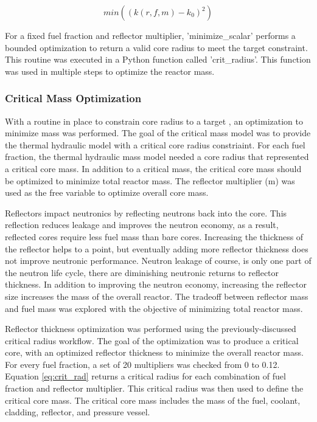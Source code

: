 \begin{equation}
    min( (k(r, f, m) - k_0)^2 )
    \label{eq:crit_rad}
\end{equation}

For a fixed fuel fraction and reflector multiplier, 'minimize\_scalar' performs a
bounded optimization to return a valid core radius to meet the target \keff
constraint. This routine was executed in a Python function called 'crit\_radius'.
This function was used in multiple steps to optimize the reactor mass.

\subsubsection{Critical Mass Optimization}
With a routine in place to constrain core radius to a target \keff, an
optimization to minimize mass was performed. The goal of the critical mass model
was to provide the thermal hydraulic model with a critical core radius
constriaint. For each
fuel fraction, the thermal hydraulic mass model needed a core radius that
represented a critical core mass. In addition to a critical mass, the critical
core mass should be optimized to minimize total reactor mass. 
The reflector multiplier (m) was used as the free variable to optimize overall core mass. 

Reflectors impact neutronics by reflecting neutrons back into the core. This
reflection reduces leakage and improves the neutron economy, as a result,
reflected cores require less fuel mass than bare cores. Increasing the
thickness of the reflector helps to a point, but eventually adding more reflector
thickness does not improve neutronic performance. Neutron leakage of course, is only
one part of the neutron life cycle, there are diminishing neutronic returns to
reflector thickness. In addition to improving the neutron economy, increasing
the reflector size increases the mass of the overall reactor. The tradeoff
between reflector mass and fuel mass was explored with the objective of
minimizing total reactor mass. 

Reflector thickness optimization was performed using the previously-discussed critical radius
workflow. The goal of the optimization was to produce a
critical core, with an optimized reflector thickness to minimize the
overall reactor mass. For every fuel fraction, a set of 20 multipliers was
checked from 0 to 0.12. Equation \ref{eq:crit_rad} returns a critical radius for
each combination of fuel fraction and reflector multiplier. This critical radius
was then used to define the critical core mass. The critical core mass includes
the mass of the fuel, coolant, cladding, reflector, and pressure vessel.

